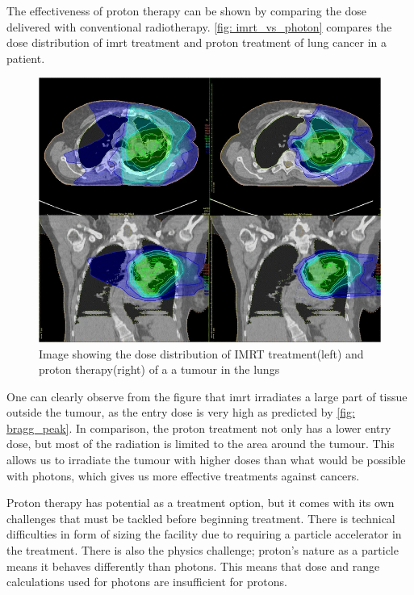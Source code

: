 \documentclass[main.tex]{subfiles}
\begin{document}
The effectiveness of proton therapy can be shown by comparing the dose delivered with conventional radiotherapy. \autoref{fig: imrt_vs_photon} compares the dose distribution of \gls{imrt} treatment and proton treatment of lung cancer in a patient.

\begin{figure}[!htpb]
    \centering
    \includegraphics[width=12cm ]{images/proton_vs_imrt.png}
    \caption{Image showing the dose distribution of IMRT treatment(left) and proton therapy(right) of a a tumour in the lungs\cite{protonimage}}
    \label{fig: imrt_vs_photon}
\end{figure}
\FloatBarrier

One can clearly observe from the figure that \gls{imrt} irradiates a large part of tissue outside the tumour, as the entry dose is very high as predicted by \autoref{fig: bragg_peak}. In comparison, the proton treatment not only has a lower entry dose, but most of the radiation is limited to the area around the tumour. This allows us to irradiate the tumour with higher doses than what would be possible with photons, which gives us more effective treatments against cancers.

Proton therapy has potential as a treatment option, but it comes with its own challenges that must be tackled before beginning treatment. There is technical difficulties in form of sizing the facility due to requiring a particle accelerator in the treatment. There is also the physics challenge; proton's nature as a particle means it behaves differently than photons. This means that dose and range calculations used for photons are insufficient for protons.\cite{proton_challenges}
\end{document}
